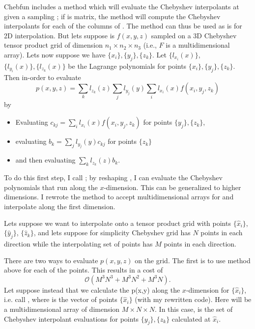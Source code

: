 \documentclass{article}
\begin{document}
Chebfun includes a  method which will evaluate the Chebyshev interpolants at  given a sampling ; if  is matrix, the method will compute the Chebyshev interpolants for each of the columns of . The method can thus be used as is for 2D interpolation. But lets suppose  is $f(x,y,z)$ sampled on a 3D Chebyshev tensor product grid of dimension $n_1 \times n_2 \times n_3$ (i.e., $F$ is a multidimensional array). Lets now suppose we have $\{x_i\},\{y_j\}, \{z_k\}$. Let $\{l_{x_i}(x)\}$, $\{l_{y_i}(x)\},\{l_{z_k}(x)\}$ be the Lagrange polynomials for points $\{x_i\},\{y_j\},\{z_k\}$. Then in-order to evaluate
\begin{equation}
p(x,y,z) = \sum_k l_{z_k}(z) \sum_j l_{y_j}(y)  \sum_i  l_{x_i}(x) f(x_i,y_j,z_k)
\end{equation}
by
\begin{itemize}
\item Evaluating $c_{kj} = \sum_i  l_{x_i}(x) f(x_i,y_j,z_k)$ for points $\{y_j\}, \{z_k\}$,
\item evaluating $b_{k} = \sum_j l_{y_j}(y) c_{kj}$ for points $\{z_k\}$
\item and then evaluating $\sum_k l_{z_k}(z) b_k$.
\end{itemize}
To do this first step, I call ; by reshaping , I can evaluate the Chebyshev polynomials that run along the $x$-dimension. This can be generalized to higher dimensions. I rewrote the  method to accept multidimensional arrays for  and interpolate along the first dimension.
 
Lets suppose we want to interpolate onto a tensor product grid with points $\{\hat{x}_i\}$, $\{\hat{y}_j\}$, $\{\hat{z}_k\}$, and lets suppose for simplicity Chebyshev grid has $N$ points in each direction while the interpolating set of points has $M$ points in each direction.

 There are two ways to evaluate $p(x,y,z)$ on the grid. The first is to use method above for each of the points. This results in a cost of
 \begin{equation}
 \mathcal{O}(M^3 N^3 + M^3 N^2 + M^3 N).
 \end{equation}
Let suppose instead that we calculate the p(x,y) along the $x$-dimension for $\{\hat{x}_i\}$, i.e. call , where  is the vector of points $\{\hat{x}_i\}$ (with my rewritten code). Here  will be a multidimensional array of dimension $M \times N \times N$. In this case,  is the set of Chebyshev interpolant evaluations for points $\{y_j\}, \{z_k\}$ calculated at $\hat{x}_i$.
\end{document}
